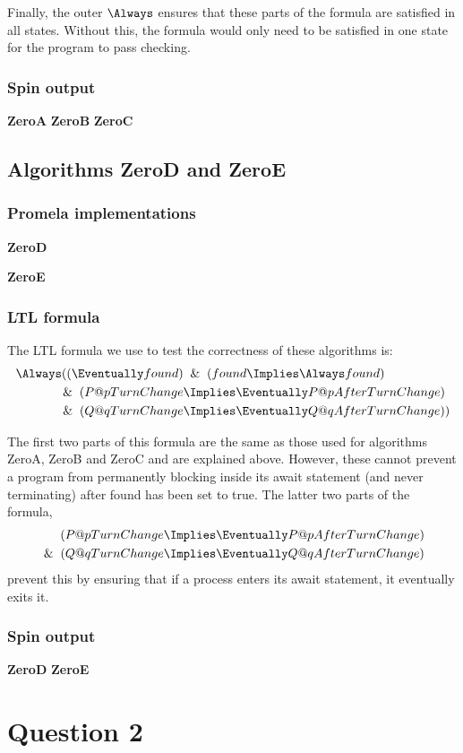 \documentclass[12pt,a4paper]{scrartcl}
\begin{document}
Finally, the outer \(\Always\) ensures that these parts of the formula are satisfied in all states. Without this, the formula would only need to be satisfied in one state for the program to pass checking.

\subsubsection{Spin output}
\textbf{ZeroA}
\textbf{ZeroB}
\textbf{ZeroC}

\subsection{Algorithms ZeroD and ZeroE}

\subsubsection{Promela implementations}

\textbf{ZeroD}

\textbf{ZeroE}


\subsubsection{LTL formula}

The LTL formula we use to test the correctness of these algorithms is:
\begin{align} 
\Always ( ( \Eventually found ) &\And ( found \Implies \Always found )\notag\\
\And ( P@pTurnChange &\Implies \Eventually P@pAfterTurnChange )\\
\And ( Q@qTurnChange &\Implies \Eventually Q@qAfterTurnChange ) )\notag
\end{align}

The first two parts of this formula are the same as those used for algorithms ZeroA, ZeroB and ZeroC and are explained above. However, these cannot prevent a program from permanently blocking inside its await statement (and never terminating) after found has been set to true. The latter two parts of the formula,
\begin{align} 
( P@pTurnChange &\Implies \Eventually P@pAfterTurnChange )\notag\\
\And ( Q@qTurnChange &\Implies \Eventually Q@qAfterTurnChange ) 
\end{align}
prevent this by ensuring that if a process enters its await statement, it eventually exits it.

\subsubsection{Spin output}

\textbf{ZeroD}
\textbf{ZeroE}

\section{Question 2}
\end{document}
